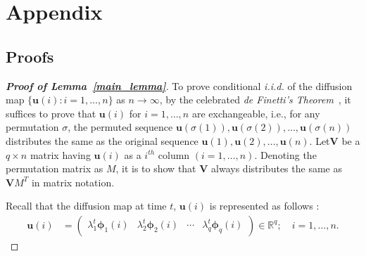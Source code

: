 \documentclass[11pt]{article}
\theoremstyle{definition}
\begin{document}
\newpage

\newpage
\section{Appendix}
\subsection{Proofs}
\label{ssec:proof}

\begin{proof}[\textbf{Proof of Lemma~\ref{main_lemma}}]
To prove conditional \textit{i.i.d.} of the diffusion map $\{\mathbf{u}(i) : i=1,\ldots,n\}$ as $n \rightarrow \infty$, by the celebrated \textit{de Finetti's Theorem}~\cite{diaconis1980finite}, it suffices to prove that $\mathbf{u}(i)$ for $i=1,\ldots,n$ are exchangeable, i.e., for any permutation $\sigma$, the permuted sequence $\mathbf{u}(\sigma(1)), \mathbf{u}(\sigma(2)), \ldots,\mathbf{u}(\sigma(n))$ distributes the same as the original sequence $\mathbf{u}(1), \mathbf{u}(2), \ldots,\mathbf{u}(n)$. Let$\mathbf{V}$ be a $q \times n$ matrix having $\mathbf{u}(i)$ as a $i^{th}$ column $(i = 1, \ldots, n)$. Denoting the permutation matrix as $M$, it is to show that $\mathbf{V}$ always distributes the same as $\mathbf{V} M^{T}$ in matrix notation. 
	
Recall that the diffusion map at time $t$, $\mathbf{u}(i)$ is represented as follows :
\begin{align}
\mathbf{u}(i)  &= \begin{pmatrix} \lambda^{t}_{1} \mathbf{\phi}_{1}(i) & \lambda^{t}_{2} \mathbf{\phi}_{2} (i)  & \cdots & \lambda^{t}_{q} \mathbf{\phi}_{q}(i) \end{pmatrix} \in \mathbb{R}^{q}; \quad i = 1, \ldots, n.
\end{align}


\end{proof}
\end{document}
